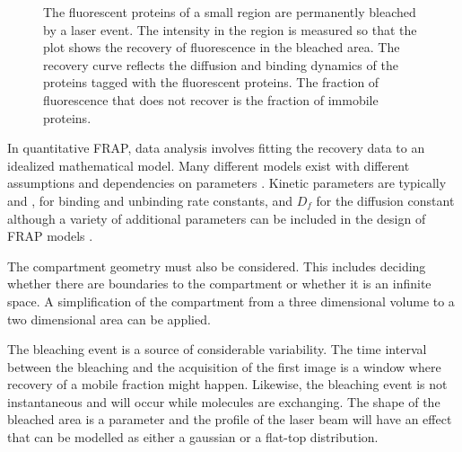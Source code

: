 \begin{figure}

                   {The fluorescent proteins of a small region are
                    permanently bleached by a laser event. The
                    intensity in the region is measured so that the
                    plot shows the recovery of fluorescence in the
                    bleached area.  The recovery curve reflects the
                    diffusion and binding dynamics of the proteins
                    tagged with the fluorescent proteins.  The
                    fraction of fluorescence that does not recover is
                    the fraction of immobile proteins.}
      \label{fig:intro:frap-curve-example}
    \end{figure}

    In quantitative FRAP, data analysis involves fitting the recovery
    data to an idealized mathematical model.
    Many different models exist with different assumptions
    and dependencies on
    parameters \citep{mcnally-frap-2010}.
    Kinetic parameters are typically \kon{} and \koff{}, for
    binding and unbinding rate constants, and $D_{f}$ for the diffusion
    constant
    although a variety of additional parameters can be included in
    the design of FRAP models \citep{mcnally-frap-2010}.

    The compartment geometry must also be considered.  This includes
    deciding whether there are boundaries to the compartment or
    whether it is an infinite space.  A simplification of the
    compartment from a three dimensional volume to a two dimensional
    area can be applied.

    The bleaching event is a source of considerable variability.
    The time interval between the bleaching and the acquisition of the
    first image is a window where recovery of a mobile fraction might
    happen.  Likewise, the bleaching event is not
    instantaneous and will occur while molecules are exchanging.
    The shape of the bleached area is a parameter and the
    profile of the laser beam will have an effect that can be modelled
    as either a gaussian or a flat-top distribution.


